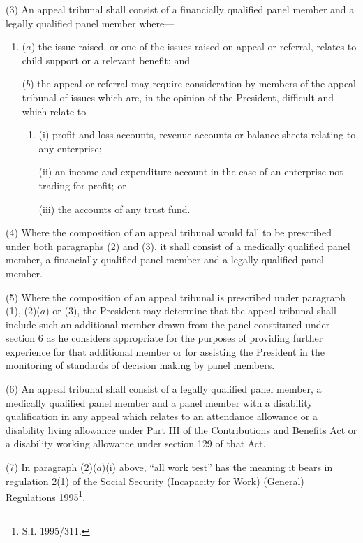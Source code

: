 \documentclass[12pt,a4paper]{article}
\begin{document}
(3) An appeal tribunal shall consist of a financially qualified panel member and a legally qualified panel member where—
\begin{enumerate}\item[]
($a$) the issue raised, or one of the issues raised on appeal or referral, relates to child support or a relevant benefit; and

($b$) the appeal or referral may require consideration by members of the appeal tribunal of issues which are, in the opinion of the President, difficult and which relate to—
\begin{enumerate}\item[]
(i) profit and loss accounts, revenue accounts or balance sheets relating to any enterprise;

(ii) an income and expenditure account in the case of an enterprise not trading for profit; or

(iii) the accounts of any trust fund.
\end{enumerate}
\end{enumerate}

(4) Where the composition of an appeal tribunal would fall to be prescribed under both paragraphs (2) and (3), it shall consist of a medically qualified panel member, a financially qualified panel member and a legally qualified panel member.

(5) Where the composition of an appeal tribunal is prescribed under 
paragraph (1), (2)($a$) or  %
(3), the President may determine that the appeal tribunal shall include such an additional member drawn from the panel constituted under section 6 as he considers appropriate for the purposes of providing further experience for that additional member or for assisting the President in the monitoring of standards of decision making by panel members.

(6) An appeal tribunal shall consist of a legally qualified panel member, a medically qualified panel member and a panel member with a disability qualification in any appeal which relates to an attendance allowance or a disability living allowance under Part III of the Contributions and Benefits Act or a disability working allowance under section 129 of that Act.

(7) In paragraph (2)($a$)(i) above, “all work test” has the meaning it bears in regulation 2(1) of the Social Security (Incapacity for Work) (General) Regulations 1995\footnote{\frenchspacing S.I. 1995/311.}.
\end{document}
